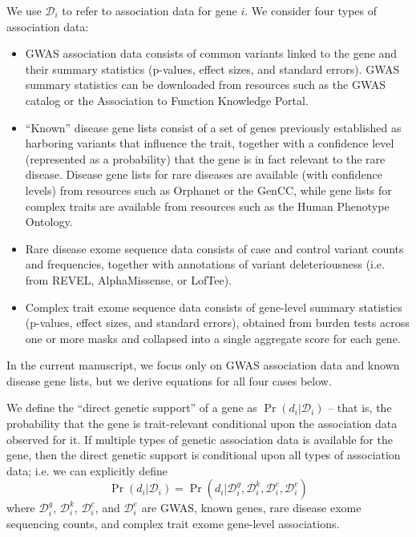 We use $\mathcal{D}_i$ to refer to association data for gene
$i$. We consider four types of association data:
\begin{itemize}
  \item GWAS association data consists of common variants linked to
    the gene and their summary statistics (p-values, effect sizes, and
    standard errors). GWAS summary statistics can be downloaded from
    resources such as the GWAS catalog\cite{} or the Association to Function
    Knowledge Portal\cite{}.
  \item ``Known'' disease gene lists consist of a set of genes previously
    established as harboring variants that influence the trait, together with a confidence level (represented as a
    probability) that the gene is in fact relevant to the rare
    disease. Disease gene lists for rare diseases are available (with confidence
    levels) from resources such as Orphanet\cite{} or the GenCC\cite{}, while gene
    lists for complex traits are available from resources such as
    the Human Phenotype Ontology\cite{}.
  \item Rare disease exome sequence data consists of case and control
    variant counts and frequencies, together with annotations of
    variant deleteriousness (i.e. from REVEL\cite{},
    AlphaMissense\cite{}, or LofTee\cite{}). 
  \item Complex trait exome sequence data consists of gene-level
    summary statistics (p-values, effect sizes, and standard errors),
    obtained from burden tests across one or more masks and collapsed
    into a single aggregate score for each gene.
\end{itemize}
In the current manuscript, we focus only on GWAS association data and
known disease gene lists, but we derive equations for all four cases below.

We define the ``direct genetic support'' of a gene as
$\Pr\left(d_i|\mathcal{D}_i\right)$ -- that is, the probability that
the gene is trait-relevant conditional upon the association data
observed for it. If multiple types of genetic association data is
available for the gene, then the direct genetic support is conditional
upon all types of association data; i.e. we can explicitly define
\[\Pr\left(d_i|\mathcal{D}_i\right) =
\Pr\left(d_i|\mathcal{D}^g_i,\mathcal{D}^k_i,\mathcal{D}^c_i,\mathcal{D}^e_i\right)\]
where $\mathcal{D}^g_i$, $\mathcal{D}^k_i$, $\mathcal{D}^c_i$, and
$\mathcal{D}^e_i$ are GWAS, known genes, rare disease exome sequencing counts, and
complex trait exome gene-level associations.

